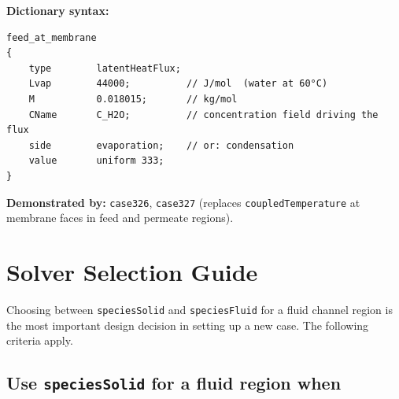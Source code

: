 \documentclass[11pt,a4paper]{article}
\newcommand{\caseref}[1]{\texttt{\color{casegreen}#1}}
\newcommand{\bctype}[1]{\texttt{\color{foamblue}#1}}
\begin{document}
\textbf{Dictionary syntax:}
\begin{verbatim}
feed_at_membrane
{
    type        latentHeatFlux;
    Lvap        44000;          // J/mol  (water at 60°C)
    M           0.018015;       // kg/mol
    CName       C_H2O;          // concentration field driving the flux
    side        evaporation;    // or: condensation
    value       uniform 333;
}
\end{verbatim}

\begin{tcolorbox}[casebox]
  \textbf{Demonstrated by:} \caseref{case326}, \caseref{case327} (replaces
  \bctype{coupledTemperature} at membrane faces in feed and permeate regions).
\end{tcolorbox}

\section{Solver Selection Guide}
\label{sec:solverselect}

Choosing between \texttt{speciesSolid} and \texttt{speciesFluid} for a fluid
channel region is the most important design decision in setting up a new case.
The following criteria apply.

\subsection{Use \texttt{speciesSolid} for a fluid region when}
\end{document}
